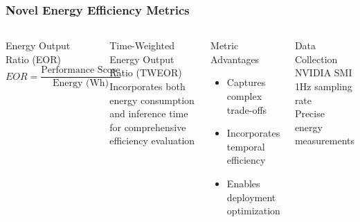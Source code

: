 \documentclass[aspectratio=169,xcolor=dvipsnames]{beamer}
\begin{document}
\begin{frame}
\frametitle{Novel Energy Efficiency Metrics}

\begin{columns}[c]

\begin{block}{Energy Output Ratio (EOR)}
$$EOR = \frac{\text{Performance Score}}{\text{Energy (Wh)}}$$
\end{block}

\vspace{0.5cm}

\begin{block}{Time-Weighted Energy Output Ratio (TWEOR)}
Incorporates both energy consumption and inference time for comprehensive efficiency evaluation
\end{block}

\begin{exampleblock}{Metric Advantages}
\begin{itemize}
\item Captures complex trade-offs
\item Incorporates temporal efficiency
\item Enables deployment optimization
\end{itemize}
\end{exampleblock}

\vspace{0.5cm}
\begin{alertblock}{Data Collection}
NVIDIA SMI\\
1Hz sampling rate\\
Precise energy measurements
\end{alertblock}

\end{columns}
\end{frame}
\end{document}
